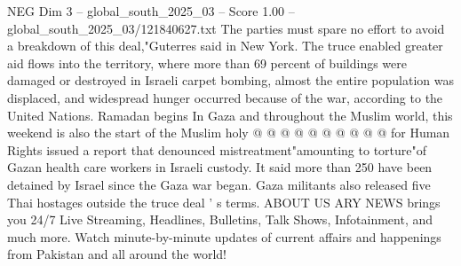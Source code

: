\begin{textsample}{NEG Dim 3 – global\_south\_2025\_03 – Score 1.00 – global\_south\_2025\_03/121840627.txt}
The parties must spare no effort to avoid a breakdown of this deal,"Guterres said in New York.
The truce enabled greater aid flows into the territory, where more than 69 percent of buildings were damaged or destroyed in Israeli carpet bombing, almost the entire population was displaced, and widespread hunger occurred because of the war, according to the United Nations.
Ramadan begins In Gaza and throughout the Muslim world, this weekend is also the start of the Muslim holy @ @ @ @ @ @ @ @ @ @ for Human Rights issued a report that denounced mistreatment"amounting to torture"of Gazan health care workers in Israeli custody.
It said more than 250 have been detained by Israel since the Gaza war began.
Gaza militants also released five Thai hostages outside the truce deal ' s terms.
ABOUT US ARY NEWS brings you 24/7 Live Streaming, Headlines, Bulletins, Talk Shows, Infotainment, and much more.
Watch minute-by-minute updates of current affairs and happenings from Pakistan and all around the world!

\end{textsample}
